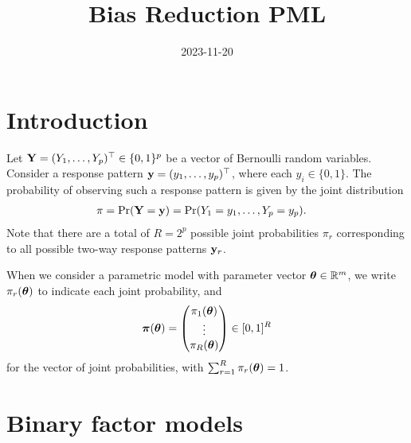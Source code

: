 \documentclass[
]{article}
\title{Bias Reduction PML}
\author{}
\date{\vspace{-2.5em}2023-11-20}
\begin{document}
\maketitle

\newcommand{\pimod}[1]{\pi_{#1}(\btheta)}
\newcommand{\Sigmaystar}{\bSigma_{\by^*}}
\newcommand{\pl}{\operatorname{\ell_P}}
\newcommand{\mlepl}{\hat\btheta_{\text{PL}}}
\newcommand{\mle}{\hat\btheta_{\text{ML}}}
\newcommand{\pimodpl}{\pi_{y_iy_j}^{(ij)}(\btheta)}
\newcommand{\tr}{\operatorname{tr}}

\section{Introduction}\label{introduction}

Let \({\mathbf Y} = (Y_1, \dots, Y_p)^\top \in \{0,1\}^p\) be a vector of
Bernoulli random variables. Consider a response pattern
\({\mathbf y} = (y_1,\dots,y_p)^\top\), where each \(y_i\in\{0,1\}\). The
probability of observing such a response pattern is given by the joint
distribution \begin{align}\label{eq:jointprob1}
\pi
&= \Pr({\mathbf Y} = {\mathbf y})  = \Pr(Y_1=y_1,\dots,Y_p=y_p).
\end{align} Note that there are a total of \(R=2^p\) possible joint
probabilities \(\pi_r\) corresponding to all possible two-way response
patterns \({\mathbf y}_r\).

When we consider a parametric model with parameter vector
\({\boldsymbol\theta}\in\mathbb{R}^m\), we write \(\pi_r({\boldsymbol\theta})\) to indicate each joint
probability, and \begin{equation}\label{eq:jointprob2}
{\boldsymbol\pi}({\boldsymbol\theta}) = \begin{pmatrix}
\pi_{1}({\boldsymbol\theta}) \\
\vdots \\
\pi_{R}({\boldsymbol\theta})  \\
\end{pmatrix} \in [0,1]^R
\end{equation} for the vector of joint probabilities, with
\(\sum_{r=1}^R \pi_{r}({\boldsymbol\theta}) =1\).

\section{Binary factor models}\label{binary-factor-models}
\end{document}

